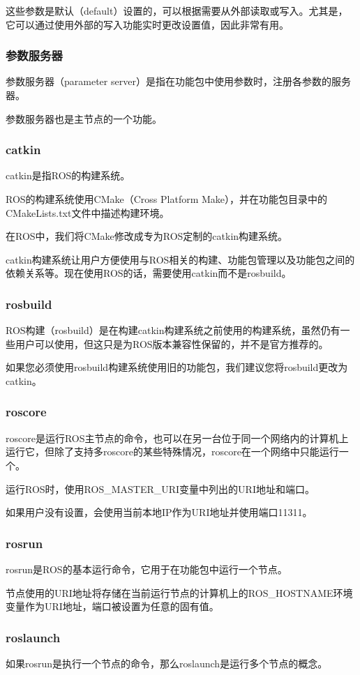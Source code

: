 \documentclass[geye,green,kindle,cn]{elegantnote}
\begin{document}
这些参数是默认（default）设置的，可以根据需要从外部读取或写入。尤其是，它可以通过使用外部的写入功能实时更改设置值，因此非常有用。
\subsubsection{参数服务器}
参数服务器（parameter server）是指在功能包中使用参数时，注册各参数的服务器。

参数服务器也是主节点的一个功能。
\subsubsection{catkin}
catkin是指ROS的构建系统。

ROS的构建系统使用CMake（Cross Platform Make），并在功能包目录中的CMakeLists.txt文件中描述构建环境。

在ROS中，我们将CMake修改成专为ROS定制的catkin构建系统。

catkin构建系统让用户方便使用与ROS相关的构建、功能包管理以及功能包之间的依赖关系等。现在使用ROS的话，需要使用catkin而不是rosbuild。
\subsubsection{rosbuild}
ROS构建（rosbuild）是在构建catkin构建系统之前使用的构建系统，虽然仍有一些用户可以使用，但这只是为ROS版本兼容性保留的，并不是官方推荐的。

如果您必须使用rosbuild构建系统使用旧的功能包，我们建议您将rosbuild更改为catkin。
\subsubsection{roscore}
roscore是运行ROS主节点的命令，也可以在另一台位于同一个网络内的计算机上运行它，但除了支持多roscore的某些特殊情况，roscore在一个网络中只能运行一个。

运行ROS时，使用ROS\_MASTER\_URI变量中列出的URI地址和端口。

如果用户没有设置，会使用当前本地IP作为URI地址并使用端口11311。
\subsubsection{rosrun}
rosrun是ROS的基本运行命令，它用于在功能包中运行一个节点。

节点使用的URI地址将存储在当前运行节点的计算机上的ROS\_HOSTNAME环境变量作为URI地址，端口被设置为任意的固有值。
\subsubsection{roslaunch}
如果rosrun是执行一个节点的命令，那么roslaunch是运行多个节点的概念。
\end{document}
